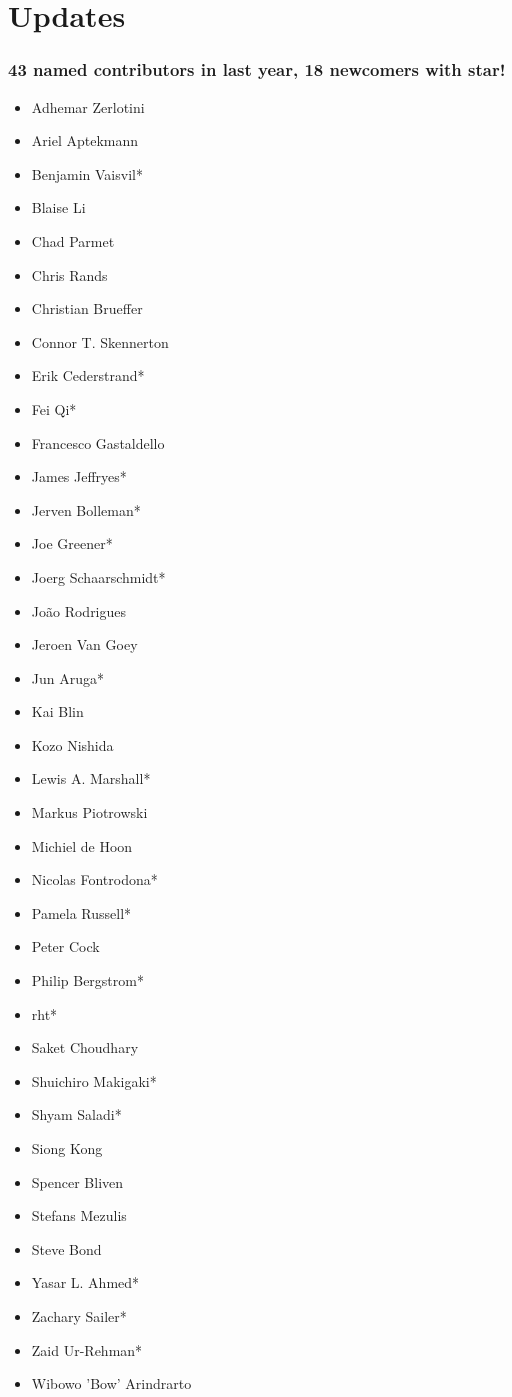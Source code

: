 \section{Updates}

\begin{frame}
  \frametitle{43 named contributors in last year, 18 newcomers with star!}
  \scriptsize{
  \begin{multicols}{3}
  \begin{itemize}
    \item Adhemar Zerlotini
    \item Ariel Aptekmann
    \item Benjamin Vaisvil*
    \item Blaise Li
    \item Chad Parmet
    \item Chris Rands
    \item Christian Brueffer
    \item Connor T. Skennerton
    \item Erik Cederstrand*
    \item Fei Qi*
    \item Francesco Gastaldello
    \item James Jeffryes*
    \item Jerven Bolleman*
    \item Joe Greener*
    \item Joerg Schaarschmidt*
    \item João Rodrigues
    \item Jeroen Van Goey
    \item Jun Aruga*
    \item Kai Blin
    \item Kozo Nishida
    \item Lewis A. Marshall*
    \item Markus Piotrowski
    \item Michiel de Hoon
    \item Nicolas Fontrodona*
    \item Pamela Russell*
    \item Peter Cock
    \item Philip Bergstrom*
    \item rht*
    \item Saket Choudhary
    \item Shuichiro Makigaki*
    \item Shyam Saladi*
    \item Siong Kong
    \item Spencer Bliven
    \item Stefans Mezulis
    \item Steve Bond
    \item Yasar L. Ahmed*
    \item Zachary Sailer*
    \item Zaid Ur-Rehman*
    \item Wibowo 'Bow' Arindrarto
  \end{itemize}
  \end{multicols}
  }
\end{frame}



